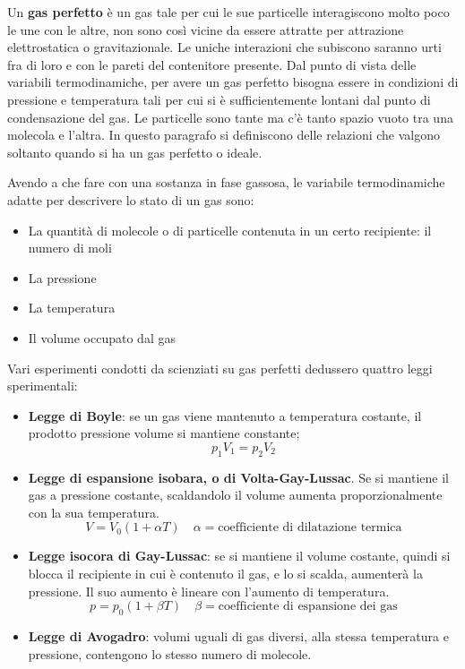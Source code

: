 Un \textbf{gas perfetto} è un gas tale per cui le sue particelle interagiscono molto poco le une con le altre, non sono così vicine da essere attratte per attrazione elettrostatica o gravitazionale. Le uniche interazioni che subiscono saranno urti fra di loro e con le pareti del contenitore presente. Dal punto di vista delle variabili termodinamiche, per avere un gas perfetto bisogna essere in condizioni di pressione e temperatura tali per cui si è sufficientemente lontani dal punto di condensazione del gas. Le particelle sono tante ma c'è tanto spazio vuoto tra una molecola e l'altra. In questo paragrafo si definiscono delle relazioni che valgono soltanto quando si ha un gas perfetto o ideale.

Avendo a che fare con una sostanza in fase gassosa, le variabile termodinamiche adatte per descrivere lo stato di un gas sono:

\begin{itemize}
	\item La quantità di molecole o di particelle contenuta in un certo recipiente: il numero di moli
	\item La pressione
	\item La temperatura
	\item Il volume occupato dal gas
\end{itemize}

Vari esperimenti condotti da scienziati su gas perfetti dedussero quattro leggi sperimentali:

\begin{itemize}
	\item \textbf{Legge di Boyle}: se un gas viene mantenuto a temperatura costante, il prodotto pressione volume si mantiene constante;
	\[ \boxed{p_1 V_1=p_2 V_2} \]
	\item \textbf{Legge di espansione isobara, o di Volta-Gay-Lussac}. Se si mantiene il gas a pressione costante, scaldandolo il volume aumenta proporzionalmente con la sua temperatura.
	\[ \boxed{V=V_0(1+\alpha T) } \quad \alpha = \text{coefficiente di dilatazione termica} \]
	\item \textbf{Legge isocora di Gay-Lussac}: se si mantiene il volume costante, quindi si blocca il recipiente in cui è contenuto il gas, e lo si scalda, aumenterà la pressione. Il suo aumento è lineare con l'aumento di temperatura.
	\[ \boxed{p=p_0(1+\beta T) } \quad \beta = \text{coefficiente di espansione dei gas} \]
	\item \textbf{Legge di Avogadro}: volumi uguali di gas diversi, alla stessa temperatura e pressione, contengono lo stesso numero di molecole.
\end{itemize}

